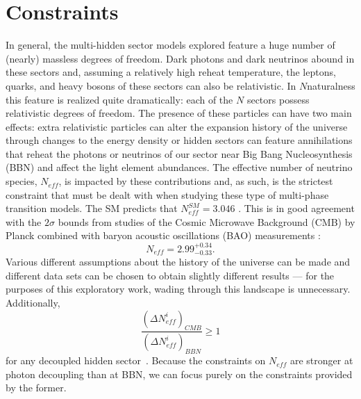 \documentclass[nofootinbib,twocolumn,preprintnumbers]{revtex4-1}
\begin{document}
\section{Constraints}
\label{sec:constraints}
In general, the multi-hidden sector models explored feature a huge number of (nearly) massless degrees of freedom. Dark photons and dark neutrinos abound in these sectors and, assuming a relatively high reheat temperature, the leptons, quarks, and heavy bosons of these sectors can also be relativistic. In $N$naturalness this feature is realized quite dramatically: each of the $N$ sectors possess relativistic degrees of freedom. The presence of these particles can have two main effects: extra relativistic particles can alter the expansion history of the universe through changes to the energy density or hidden sectors can feature annihilations that reheat the photons or neutrinos of our sector near Big Bang Nucleosynthesis (BBN) and affect the light element abundances. The effective number of neutrino species, $N_{eff}$, is impacted by these contributions and, as such, is the strictest constraint that must be dealt with when studying these type of multi-phase transition models. 
The SM predicts that $N^{SM}_{eff} = 3.046$ \cite{Mangano:2005cc}. This is in good agreement with the $2\sigma$ bounds from studies of the Cosmic Microwave Background (CMB) by Planck combined with baryon acoustic oscillations (BAO) measurements \cite{Aghanim:2018eyx}:
\begin{equation}\label{eqn:neffBounds}
N_{eff} = 2.99^{+0.34}_{-0.33}.
\end{equation}
Various different assumptions about the history of the universe can be made and different data sets can be chosen to obtain slightly different results \cite{Breitbach:2018ddu} --- for the purposes of this exploratory work, wading through this landscape is unnecessary. Additionally, 
\begin{equation}
\frac{(\Delta N^i_{eff})_{CMB}}{(\Delta N^i_{eff})_{BBN}} \geq 1
\end{equation}
for any decoupled hidden sector~\cite{Arkani-Hamed:2016rle}. Because the constraints on $N_{eff}$ are stronger at photon decoupling than at BBN, we can focus purely on the constraints provided by the former.
\end{document}
